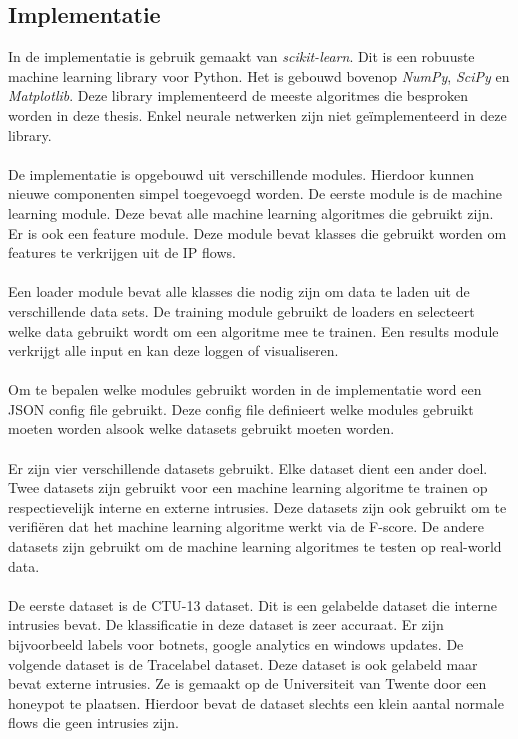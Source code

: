 \begin{samenvatting}
\section{Implementatie}
In de implementatie is gebruik gemaakt van \textit{scikit-learn}. Dit is een robuuste  machine learning library voor Python. Het is gebouwd bovenop \textit{NumPy}, \textit{SciPy} en \textit{Matplotlib}. Deze library implementeerd de meeste algoritmes die besproken worden in deze thesis. Enkel neurale netwerken zijn niet ge\"implementeerd in deze library. \\
\\
De implementatie is opgebouwd uit verschillende modules. Hierdoor kunnen nieuwe componenten simpel toegevoegd worden. De eerste module is de machine learning module. Deze bevat alle machine learning algoritmes die gebruikt zijn. Er is ook een feature module. Deze module bevat klasses die gebruikt worden om features te verkrijgen uit de IP flows. \\
\\
Een loader module bevat alle klasses die nodig zijn om data te laden uit de verschillende data sets. De training module gebruikt de loaders en selecteert welke data gebruikt wordt om een algoritme mee te trainen. Een results module verkrijgt alle input en kan deze loggen of visualiseren.\\
\\
Om te bepalen welke modules gebruikt worden in de implementatie word een JSON config file gebruikt. Deze config file definieert welke modules gebruikt moeten worden alsook welke datasets gebruikt moeten worden. \\
\\
Er zijn vier verschillende datasets gebruikt. Elke dataset dient een ander doel. Twee datasets zijn gebruikt voor een machine learning algoritme te trainen op respectievelijk interne en externe intrusies. Deze datasets zijn ook gebruikt om te verifi\"eren dat het machine learning algoritme werkt via de F-score. De andere datasets zijn gebruikt om de machine learning algoritmes te testen op real-world data. \\
\\
De eerste dataset is de CTU-13 dataset. Dit is een gelabelde dataset die interne intrusies bevat. De klassificatie in deze dataset is zeer accuraat. Er zijn bijvoorbeeld labels voor botnets, google analytics en windows updates. De volgende dataset is de Tracelabel dataset. Deze dataset is ook gelabeld maar bevat externe intrusies. Ze is gemaakt op de Universiteit van Twente door een honeypot te plaatsen. Hierdoor bevat de dataset slechts een klein aantal normale flows die geen intrusies zijn.\\

\end{samenvatting}
